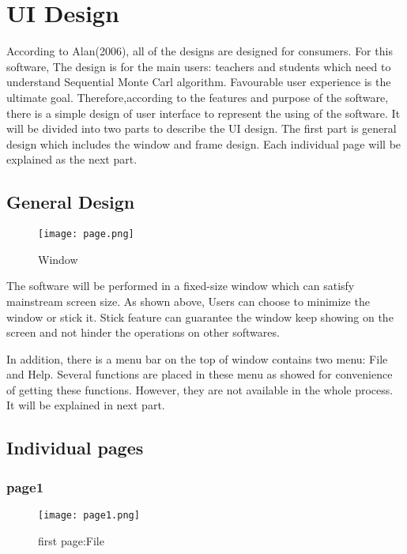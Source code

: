 \documentclass{article}
\begin{document}
\section{UI Design}
According to Alan(2006), all of the designs are designed for consumers. For this software, The design is for the main users: teachers and students which need to understand Sequential Monte Carl algorithm. Favourable user experience is the ultimate goal. Therefore,according to the features and purpose of the software, there is a simple design of user interface to represent the using of the software. It will be divided into two parts to describe the UI design. The first part is general design which includes the window and frame design. Each individual page will be explained as the next part.
    \subsection{General Design}

    \begin{figure}[ht]
        \centering
        \texttt{[image: page.png]}
        \caption{Window}
        \label{fig:label}
    \end{figure}
    The software will be performed in a fixed-size window which can satisfy mainstream screen size. As shown above, Users can choose to minimize the window or stick it. Stick feature can guarantee the window keep showing on the screen and not hinder the operations on other softwares.
   
    In addition, there is a menu bar on the top of window contains two menu: File and Help. Several functions are placed in these menu as showed for convenience of getting these functions. However, they are not available in the whole process. It will be explained in next part.  

    \subsection{Individual pages}
        \subsubsection{page1}
        
        \begin{figure}[ht]
            \centering
            \texttt{[image: page1.png]}
            \caption{first page:File}
            \label{fig:label1}
        \end{figure}
        
\end{document}
